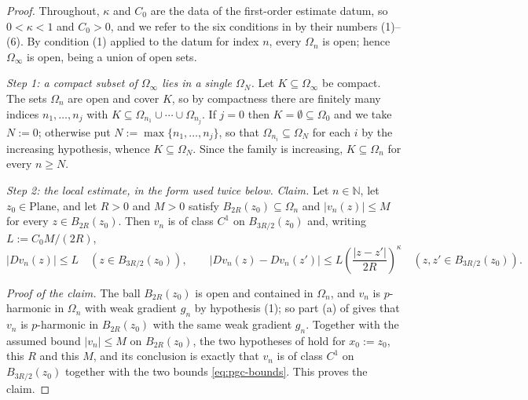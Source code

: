 \begin{proof}
Throughout, $\kappa$ and $C_0$ are the data of the first-order estimate datum, so $0<\kappa<1$
and $C_0>0$, and we refer to the six conditions in  by their numbers
(1)--(6).  By condition (1) applied to the datum for index $n$, every $\Omega_n$ is open; hence
$\Omega_\infty$ is open, being a union of open sets.

\medskip\noindent\emph{Step 1: a compact subset of $\Omega_\infty$ lies in a single
$\Omega_N$.}
Let $K\subseteq\Omega_\infty$ be compact.  The sets $\Omega_n$ are open and cover $K$, so by
compactness there are finitely many indices $n_1,\ldots,n_j$ with
$K\subseteq\Omega_{n_1}\cup\cdots\cup\Omega_{n_j}$.  If $j=0$ then $K=\emptyset\subseteq\Omega_0$
and we take $N:=0$; otherwise put $N:=\max\{n_1,\ldots,n_j\}$, so that
$\Omega_{n_i}\subseteq\Omega_N$ for each $i$ by the increasing hypothesis, whence
$K\subseteq\Omega_N$.  Since the family is increasing, $K\subseteq\Omega_n$ for every $n\ge N$.

\medskip\noindent\emph{Step 2: the local estimate, in the form used twice below.}
\emph{Claim.}  Let $n\in\mathbb{N}$, let $z_0\in\mathrm{Plane}$, and let $R>0$ and $M>0$ satisfy
$B_{2R}(z_0)\subseteq\Omega_n$ and $\lvert v_n(z)\rvert\le M$ for every $z\in B_{2R}(z_0)$.
Then $v_n$ is of class $C^{1}$ on $B_{3R/2}(z_0)$ and, writing $L:=C_0M/(2R)$,
\begin{equation}\label{eq:pgc-bounds}
  \lvert Dv_n(z)\rvert\le L\quad(z\in B_{3R/2}(z_0)),
  \qquad
  \lvert Dv_n(z)-Dv_n(z')\rvert\le L\left(\frac{\lvert z-z'\rvert}{2R}\right)^{\kappa}
  \quad(z,z'\in B_{3R/2}(z_0)).
\end{equation}

\emph{Proof of the claim.}  The ball $B_{2R}(z_0)$ is open and contained in $\Omega_n$, and
$v_n$ is $p$-harmonic in $\Omega_n$ with weak gradient $g_n$ by hypothesis (1); so part (a) of
 gives that $v_n$ is $p$-harmonic in $B_{2R}(z_0)$ with the same weak
gradient $g_n$.  Together with the assumed bound $\lvert v_n\rvert\le M$ on $B_{2R}(z_0)$, the
two hypotheses of  hold for $x_0:=z_0$, this $R$ and this $M$,
and its conclusion is exactly that $v_n$ is of class $C^{1}$ on $B_{3R/2}(z_0)$ together with
the two bounds \eqref{eq:pgc-bounds}.  This proves the claim.


\end{proof}
